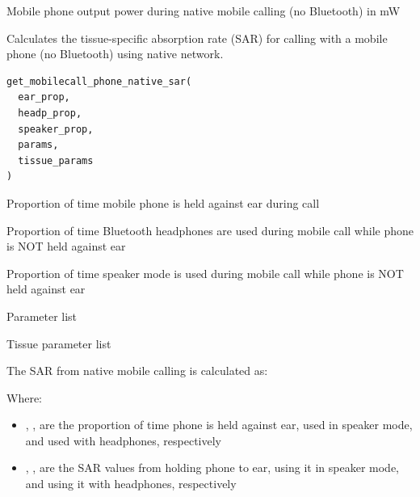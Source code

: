 \documentclass[a4paper]{book}
\begin{document}
%
\begin{Value}
Mobile phone output power during native mobile calling (no Bluetooth) in mW
\end{Value}
%
\begin{Description}
Calculates the tissue-specific absorption rate (SAR) for calling with a mobile phone (no Bluetooth) using native network.
\end{Description}
%
\begin{Usage}
\begin{verbatim}
get_mobilecall_phone_native_sar(
  ear_prop,
  headp_prop,
  speaker_prop,
  params,
  tissue_params
)
\end{verbatim}
\end{Usage}
%
\begin{Arguments}
\begin{ldescription}
\item[\code{ear\_prop}] Proportion of time mobile phone is held against ear during call

\item[\code{headp\_prop}] Proportion of time Bluetooth headphones are used during mobile call while phone is NOT held against ear

\item[\code{speaker\_prop}] Proportion of time speaker mode is used during mobile call while phone is NOT held against ear

\item[\code{params}] Parameter list

\item[\code{tissue\_params}] Tissue parameter list
\end{ldescription}
\end{Arguments}
%
\begin{Details}
The SAR from native mobile calling is calculated as:

Where:
\begin{itemize}

\item{} , ,  are the proportion of time phone is held against ear, used in speaker mode, and used with headphones, respectively
\item{} , ,  are the SAR values from holding phone to ear, using it in speaker mode, and using it with headphones, respectively

\end{itemize}

\end{Details}
\end{document}

